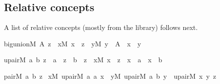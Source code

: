 \subsection{Relative concepts\label{sec:def-main-relative}%
}
A list of relative concepts (mostly from the 
    library) follows next.%
\begin{isabelle}%
big{\isacharunderscore}{\kern0pt}union{\isacharparenleft}{\kern0pt}M{\isacharcomma}{\kern0pt}\ A{\isacharcomma}{\kern0pt}\ z{\isacharparenright}{\kern0pt}\ {\isasymequiv}\ {\isasymforall}x{\isacharbrackleft}{\kern0pt}M{\isacharbrackright}{\kern0pt}{\isachardot}{\kern0pt}\ x\ {\isasymin}\ z\ {\isasymlongleftrightarrow}\ {\isacharparenleft}{\kern0pt}{\isasymexists}y{\isacharbrackleft}{\kern0pt}M{\isacharbrackright}{\kern0pt}{\isachardot}{\kern0pt}\ y\ {\isasymin}\ A\ {\isasymand}\ x\ {\isasymin}\ y{\isacharparenright}{\kern0pt}%
\end{isabelle}%
\begin{isabelle}%
upair{\isacharparenleft}{\kern0pt}M{\isacharcomma}{\kern0pt}\ a{\isacharcomma}{\kern0pt}\ b{\isacharcomma}{\kern0pt}\ z{\isacharparenright}{\kern0pt}\ {\isasymequiv}\ a\ {\isasymin}\ z\ {\isasymand}\ b\ {\isasymin}\ z\ {\isasymand}\ {\isacharparenleft}{\kern0pt}{\isasymforall}x{\isacharbrackleft}{\kern0pt}M{\isacharbrackright}{\kern0pt}{\isachardot}{\kern0pt}\ x\ {\isasymin}\ z\ {\isasymlongrightarrow}\ x\ {\isacharequal}{\kern0pt}\ a\ {\isasymor}\ x\ {\isacharequal}{\kern0pt}\ b{\isacharparenright}{\kern0pt}%
\end{isabelle}%
\begin{isabelle}%
pair{\isacharparenleft}{\kern0pt}M{\isacharcomma}{\kern0pt}\ a{\isacharcomma}{\kern0pt}\ b{\isacharcomma}{\kern0pt}\ z{\isacharparenright}{\kern0pt}\ {\isasymequiv}\isanewline
{\isasymexists}x{\isacharbrackleft}{\kern0pt}M{\isacharbrackright}{\kern0pt}{\isachardot}{\kern0pt}\ upair{\isacharparenleft}{\kern0pt}M{\isacharcomma}{\kern0pt}\ a{\isacharcomma}{\kern0pt}\ a{\isacharcomma}{\kern0pt}\ x{\isacharparenright}{\kern0pt}\ {\isasymand}\ {\isacharparenleft}{\kern0pt}{\isasymexists}y{\isacharbrackleft}{\kern0pt}M{\isacharbrackright}{\kern0pt}{\isachardot}{\kern0pt}\ upair{\isacharparenleft}{\kern0pt}M{\isacharcomma}{\kern0pt}\ a{\isacharcomma}{\kern0pt}\ b{\isacharcomma}{\kern0pt}\ y{\isacharparenright}{\kern0pt}\ {\isasymand}\ upair{\isacharparenleft}{\kern0pt}M{\isacharcomma}{\kern0pt}\ x{\isacharcomma}{\kern0pt}\ y{\isacharcomma}{\kern0pt}\ z{\isacharparenright}{\kern0pt}{\isacharparenright}{\kern0pt}%
\end{isabelle}%
